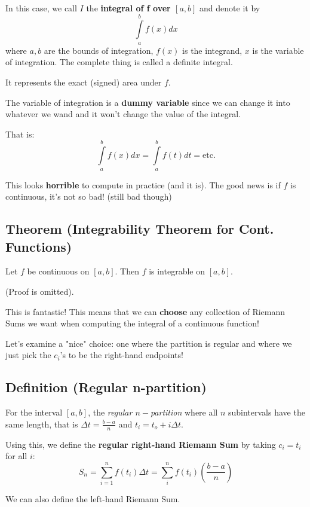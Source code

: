 In this case, we call $ I $ the \textbf{integral of f over $ [a,b] $ } and denote it by
\[ \int\limits_{a}^{b} f(x) dx \]
where $ a,b $ are the bounds of integration, $ f(x) $ is the integrand, $ x $ is the
variable of integration. The complete thing is called a definite integral.

It represents the exact (signed) area under $ f $.

\begin{remark}
    The variable of integration is a \textbf{dummy variable} since we can change it into
    whatever we wand and it won't change the value of the integral.

    That is:
    \[
        \int\limits_{a}^{b} f(x) dx =
        \int\limits_{a}^{b} f(t) d{t} = \text{etc.}
    \]
\end{remark}

This looks \textbf{horrible} to compute in practice (and it is). The good news is if
$ f $ is continuous, it's not so bad! (still bad though)

\subsection{Theorem (Integrability Theorem for Cont. Functions)}
Let $ f $ be continuous on $ [a,b] $. Then $ f $ is integrable on $ [a,b] $.

(Proof is omitted).

This is fantastic! This means that we can \textbf{choose} any collection of Riemann Sums
we want when computing the integral of a continuous function!

Let's examine a "nice" choice: one where the partition is regular and where we just
pick the $ c_i $'s to be the right-hand endpoints!

\subsection{Definition (Regular n-partition)}
For the interval $ [a,b] $, the \emph{regular $n-$partition} where all $ n $ subintervals
have the same length, that is $ \Delta t=\frac{b-a}{n} $ and $ t_i=t_o+i\Delta t $.

Using this, we define the \textbf{regular right-hand Riemann Sum} by taking $ c_i=t_i $ for
all $ i $:
\[ S_n=\sum\limits_{i=1}^{n} f(t_i)\Delta t=\sum\limits_{i}^{n} f(t_i)\left(\frac{b-a}{n}\right) \]

\begin{remark}
    We can also define the left-hand Riemann Sum.
\end{remark}

